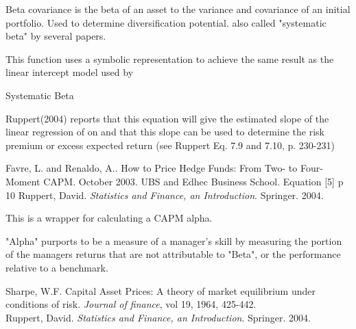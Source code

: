 \documentclass[12pt,letterpaper,english]{article}
\begin{document}
\begin{Description}\relax
Beta covariance is the beta of an asset to the variance and covariance of an initial portfolio.  Used to determine diversification potential. also called "systematic beta" by several papers.

This function uses a symbolic representation to achieve the same result as the linear intercept model used by 
\end{Description}
\begin{Details}\relax
Systematic Beta 


Ruppert(2004) reports that this equation will give the estimated slope of the linear regression of on  and that this slope can be used to determine the risk premium or excess expected return (see Ruppert Eq. 7.9 and 7.10, p. 230-231)
\end{Details}
\begin{References}\relax
Favre, L. and Renaldo, A.. How to Price Hedge Funds: From Two- to Four-Moment CAPM. October 2003. UBS and Edhec Business School. Equation [5] p 10
Ruppert, David. \emph{Statistics and Finance, an Introduction}. Springer. 2004.
\end{References}



\begin{Description}\relax
This is a wrapper for calculating a CAPM alpha.

"Alpha" purports to be a measure of a manager's skill by measuring the portion of the managers returns that are not attributable to "Beta", or the performance relative to a benchmark.
\end{Description}
\begin{References}\relax
Sharpe, W.F. Capital Asset Prices: A theory of market equilibrium under conditions of risk. \emph{Journal of finance}, vol 19, 1964, 425-442. \\
Ruppert, David. \emph{Statistics and Finance, an Introduction}. Springer. 2004. \\
\end{References}
\end{document}
